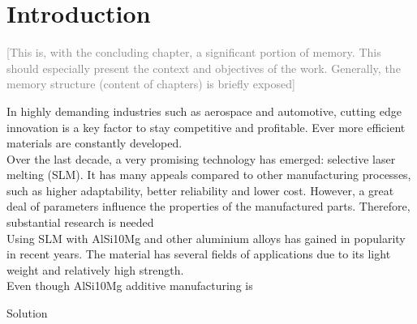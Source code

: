 \chapter{Introduction}
\label{Chap1}

\textcolor{gray}{[This is, with the concluding chapter, a significant portion of memory. This should
especially present the context and objectives of the work. Generally, the memory structure (content
of chapters) is briefly exposed]}

In highly demanding industries such as aerospace and automotive, cutting edge innovation is a key factor to stay competitive and profitable. Ever more efficient materials are constantly developed.\\

Over the last decade, a very promising technology has emerged: selective laser melting (SLM). It has many appeals compared to other manufacturing processes, such as higher adaptability, better reliability and lower cost. However, a great deal of parameters influence the properties of the manufactured parts. Therefore, substantial research is needed \\

Using SLM with AlSi10Mg and other aluminium alloys has gained in popularity in recent years. The material has several fields of applications due to its light weight and relatively high strength.\\

Even though AlSi10Mg additive manufacturing is 


Solution
